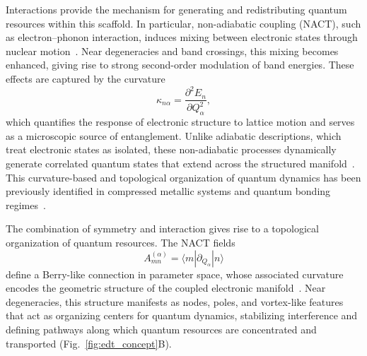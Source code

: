 \documentclass[twocolumn,10pt]{article}
\begin{document}
Interactions provide the mechanism for generating and redistributing quantum resources within this scaffold. In particular, non-adiabatic coupling (NACT), such as electron--phonon interaction, induces mixing between electronic states through nuclear motion~\cite{Mead1979,Yarkony1996}. Near degeneracies and band crossings, this mixing becomes enhanced, giving rise to strong second-order modulation of band energies. These effects are captured by the curvature
\begin{equation}
\kappa_{n\alpha} = \frac{\partial^2 E_n}{\partial Q_\alpha^2},
\end{equation}
which quantifies the response of electronic structure to lattice motion and serves as a microscopic source of entanglement. Unlike adiabatic descriptions, which treat electronic states as isolated, these non-adiabatic processes dynamically generate correlated quantum states that extend across the structured manifold~\cite{BornOppenheimer1927}. This curvature-based and topological organization of quantum dynamics has been previously identified in compressed metallic systems and quantum bonding regimes~\cite{Hu2024_ACP,Hu2025_APQ,Hu2026_JPCM}.

The combination of symmetry and interaction gives rise to a topological organization of quantum resources. The NACT fields
\begin{equation}
A^{(\alpha)}_{mn} = \langle m | \partial_{Q_\alpha} | n \rangle
\end{equation}
define a Berry-like connection in parameter space, whose associated curvature encodes the geometric structure of the coupled electronic manifold~\cite{Berry1984,Xiao2010}. Near degeneracies, this structure manifests as nodes, poles, and vortex-like features that act as organizing centers for quantum dynamics, stabilizing interference and defining pathways along which quantum resources are concentrated and transported (Fig.~\ref{fig:edt_concept}B).

\end{document}
